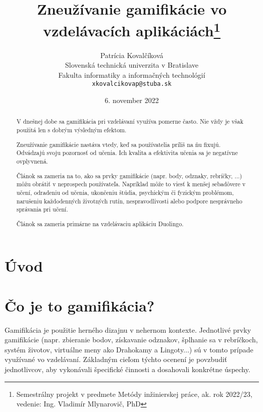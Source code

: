\documentclass[10pt,twoside,slovak,a4paper]{article}
\title{Zneužívanie gamifikácie vo vzdelávacích aplikáciách\thanks{Semestrálny projekt v predmete Metódy inžinierskej práce, ak. rok 2022/23, vedenie: Ing. Vladimír Mlynarovič, PhD}}
\author{Patrícia Kovalčíková\\[2pt]
	{\small Slovenská technická univerzita v Bratislave}\\
	{\small Fakulta informatiky a informačných technológií}\\
	{\small \texttt{xkovalcikovap@stuba.sk}}
	}
\date{\small 6. november 2022}
\begin{document}
\maketitle

\begin{abstract}
V dnešnej dobe sa gamifikácia pri vzdelávaní využíva pomerne často. Nie vždy je však použitá len s dobrým výsledným efektom. 

Zneužívanie gamifikácie nastáva vtedy, keď sa používatelia príliš na ňu fixujú\cite{HadiMogavi2022}. Odvádzajú svoju pozornosť od učenia. Ich kvalita a efektivita učenia sa je negatívne ovplyvnená.

Článok sa zameria na to, ako sa prvky gamifikácie (napr. body, odznaky, rebríčky, ...) môžu obrátiť v neprospech používateľa. Napríklad môže to viesť k menšej sebadôvere v učení, odradeniu od učenia, ukončeniu štúdia, psychickým či fyzickým problémom, narušeniu každodenných životných rutín, nespravodlivosti alebo podpore nesprávneho správania pri učení\cite{HadiMogavi2022}. 

Článok sa zameria primárne na vzdelávaciu aplikáciu Duolingo. 

\end{abstract}



\section{Úvod}



%
%



\section{Čo je to gamifikácia?} \label{Čo je to gamifikácia?}


Gamifikácia je použitie herného dizajnu v nehernom kontexte\cite{Definition}. Jednotlivé prvky gamifikácie (napr. zbieranie bodov, získavanie odznakov, šplhanie sa v rebríčkoch, systém životov, virtuálne meny ako Drahokamy a Lingoty...) sú v tomto prípade využívané vo vzdelávaní. Základným cieľom týchto ocenení je povzbudiť jednotlivcov, aby vykonávali špecifické činnosti a dosahovali konkrétne úspechy\cite{Definition}.
\end{document}
